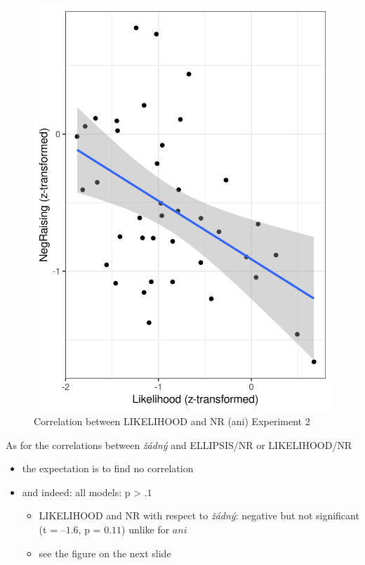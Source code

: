 \documentclass[
  ignorenonframetext,
]{beamer}
\providecommand{\tightlist}{%
  \setlength{\itemsep}{0pt}\setlength{\parskip}{0pt}}\usepackage{longtable,booktabs,array}
\newcommand{\cond}[1]{\textsc{#1}}
\begin{document}
\begin{frame}
\begin{figure}

{\centering \includegraphics{"exp2_correlations_ani.png"}

}

\caption{Correlation between LIKELIHOOD and NR (ani) Experiment 2}

\end{figure}
\end{frame}

\begin{frame}
As for the correlations between \emph{žádný} and
\cond{ELLIPSIS}/\cond{NR} or \cond{LIKELIHOOD}/\cond{NR}

\begin{itemize}
\tightlist
\item
  the expectation is to find no correlation
\item
  and indeed: all models: p \textgreater{} \(.1\)

  \begin{itemize}
  \tightlist
  \item
    \cond{LIKELIHOOD} and \cond{NR} with respect to \emph{žádný}:
    negative but not significant (t = \(–1.6\), p = \(0.11\)) unlike for
    \(ani\)
  \item
    see the figure on the next slide
  \end{itemize}
\end{itemize}
\end{frame}
\end{document}
